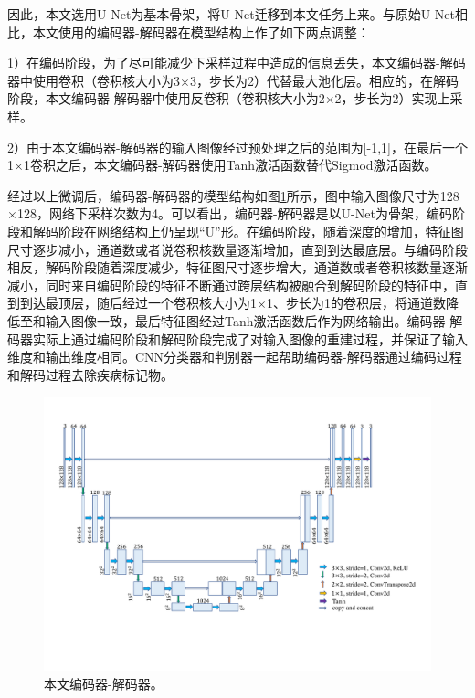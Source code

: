 因此，本文选用U-Net为基本骨架，将U-Net迁移到本文任务上来。与原始U-Net相比，本文使用的编码器-解码器在模型结构上作了如下两点调整：

1）在编码阶段，为了尽可能减少下采样过程中造成的信息丢失，本文编码器-解码器中使用卷积（卷积核大小为3$\times$3，步长为2）代替最大池化层。相应的，在解码阶段，本文编码器-解码器中使用反卷积（卷积核大小为2$\times$2，步长为2）实现上采样。

2）由于本文编码器-解码器的输入图像经过预处理之后的范围为[-1,1]，在最后一个1$\times$1卷积之后，本文编码器-解码器使用Tanh激活函数替代Sigmod激活函数。

经过以上微调后，编码器-解码器的模型结构如图\ref{fig:auto_encoder_architecture}所示，图中输入图像尺寸为128$\times$128，网络下采样次数为4。可以看出，编码器-解码器是以U-Net为骨架，编码阶段和解码阶段在网络结构上仍呈现“U”形。在编码阶段，随着深度的增加，特征图尺寸逐步减小，通道数或者说卷积核数量逐渐增加，直到到达最底层。与编码阶段相反，解码阶段随着深度减少，特征图尺寸逐步增大，通道数或者卷积核数量逐渐减小，同时来自编码阶段的特征不断通过跨层结构被融合到解码阶段的特征中，直到到达最顶层，随后经过一个卷积核大小为1$\times$1、步长为1的卷积层，将通道数降低至和输入图像一致，最后特征图经过Tanh激活函数后作为网络输出。编码器-解码器实际上通过编码阶段和解码阶段完成了对输入图像的重建过程，并保证了输入维度和输出维度相同。CNN分类器和判别器一起帮助编码器-解码器通过编码过程和解码过程去除疾病标记物。
\begin{figure}[h]
	\centering
	\includegraphics[width=1.0\textwidth]{figure/auto_encoder_architecture}
	\caption[本文编码器-解码器]{本文编码器-解码器。}
	\label{fig:auto_encoder_architecture}
\end{figure}
\vspace{-0.7cm}
